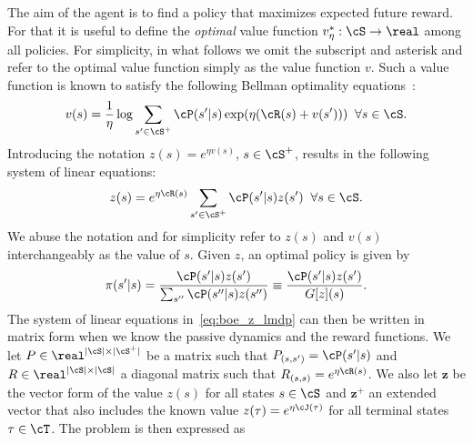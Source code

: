 The aim of the agent is to find a policy that maximizes expected future reward. For that it is useful to define the \textit{optimal} value function $v_\eta^*:\cS\rightarrow\real$ among all policies. For simplicity, in what follows we omit the subscript and asterisk 
and refer to the optimal value function simply as the value function $v$. Such a value function is known to satisfy the following Bellman
optimality equations~\citep{Todorov2006}:
\begin{equation}
  v(s) = \frac 1 \eta \log{\sum_{s'\in\cS^+}\cP(s'\lvert s)\exp(\eta(\cR(s) + v(s')))} \;\;\forall s\in\cS.
  \label{eq:boe_lmdp}
\end{equation}
Introducing the notation $z(s)= e^{\eta v(s)}$, $s\in\cS^+$, results in the following
system of linear equations:
\begin{equation}
  z(s) = e^{\eta\cR(s)} \sum_{s'\in\cS^+}\cP(s'\lvert s)z(s') \;\;\forall s\in\cS.
  \label{eq:boe_z_lmdp}
\end{equation}
We abuse the notation and for simplicity refer to $z(s)$ and $v(s)$ interchangeably as the value of $s$. Given $z$, an optimal policy is given by
\begin{equation}
  \pi(s'\lvert s) = \frac{\cP(s'\lvert s) z(s')}{ \sum_{s''} \cP(s''\lvert s)z(s'')} \equiv \frac{\cP(s'\lvert s)z(s')}{G[z](s)}.
  \label{eq:optimal_policy}
\end{equation}
The system of linear equations in~\eqref{eq:boe_z_lmdp} can then be written in matrix form when we know the passive dynamics and the reward functions. We let $P \in \real^{\lvert\cS\rvert\times\lvert\cS^+\rvert}$ be a matrix such that $P_{(s,s')}=\cP(s'\lvert s)$ and $R \in \real^{\lvert\cS\rvert\times\lvert\cS\rvert}$ a diagonal matrix such that $R_{(s, s)} = e^{\eta\cR(s)}$. We also let ${\mathbf z}$ be the vector form of the value $z(s)$ for all states $s\in\cS$ and ${\mathbf z^+}$ an extended vector that also includes the known value $z(\tau)=e^{\eta\cJ(\tau)}$ for all terminal states $\tau\in\cT$. The problem is then expressed as
